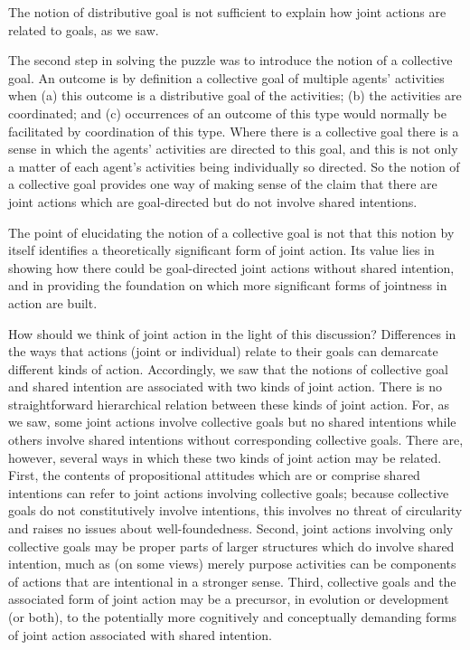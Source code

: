 \documentclass[12pt,a4paper]{extarticle}
\begin{document}
The notion of distributive goal is not sufficient to explain how joint actions are related to goals, as we saw.

The second step in solving the puzzle was to introduce the notion of a collective goal.  An outcome is by definition a collective goal of multiple agents' activities when (a) this outcome is a distributive goal of the activities; (b) the activities are coordinated; and (c)  occurrences of an outcome of this type would normally be facilitated by coordination of this type.  Where there is a collective goal there is a sense in which the agents' activities are directed to this goal, and this is not only a matter of each agent's activities being individually so directed.
So the notion of a collective goal provides one way of making sense of the claim that there are joint actions which are goal-directed but do not involve shared intentions.

The point of elucidating the notion of a collective goal is not that this notion by itself identifies a theoretically significant form of joint action.  Its value lies in showing how there could be goal-directed joint actions without shared intention, and in providing the foundation on which more significant forms of jointness in action are built.


How should we think of joint action in the light of this discussion? 
Differences in the ways that actions (joint or individual) relate to their goals can demarcate different kinds of action.
Accordingly, we saw that the notions of collective goal and shared intention are associated with two kinds of joint action.
There is no straightforward hierarchical relation between these kinds of joint action.  
For, as we saw, some joint actions involve collective goals but no shared intentions while others involve shared intentions without corresponding collective goals.  
There are, however, several ways in which these two kinds of joint action may be related.
First, the contents of propositional attitudes which are or comprise shared intentions can refer to joint actions involving collective goals; because collective goals do not constitutively involve intentions, this involves no threat of circularity and raises no issues about well-foundedness.
Second, joint actions involving only collective goals may be proper parts of larger structures which do involve shared intention, much as (on some views) merely purpose activities can be components of actions that are intentional in a stronger sense.
Third, collective goals and the associated form of joint action may be a precursor, in evolution or development (or both), to the potentially more cognitively and conceptually demanding forms of joint action associated with shared intention.
\end{document}
